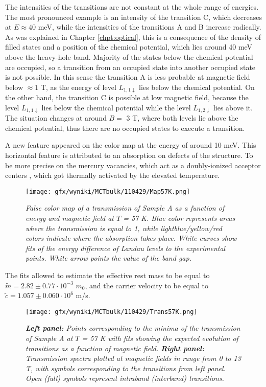 \documentclass[titlepage,a4paper]{book}
\begin{document}
The intensities of the transitions are not constant at the whole range of energies. The most pronounced example is an intensity of the transition C, which decreases at $E \approx 40$ meV, while the intensities of the transitions A and B increase radically. As was explained in Chapter \ref{chpt:optical}, this is a consequence of the density of filled states and a position of the chemical potential, which lies around 40 meV above the heavy-hole band. Majority of the states below the chemical potential are occupied, so a transition from an occupied state into another occupied state is not possible. In this sense the transition A is less probable at magnetic field below $\approx 1$ T, as the energy of level $L_{1,1\downarrow}$ lies below the chemical potential. On the other hand, the transition C is possible at low magnetic field, because the level $L_{1,1\downarrow}$ lies below the chemical potential while the level $L_{1,2\downarrow}$ lies above it. The situation changes at around $B =$ 3 T, where both levels lie above the chemical potential, thus there are no occupied states to execute a transition. 
 
A new feature appeared on the color map at the energy of around 10 meV. This horizontal feature is attributed to an absorption on defects of the structure. To be more precise on the mercury vacancies, which act as a doubly-ionized acceptor centers \cite{Kozlov_MCT_bulk}, which got thermally activated by the elevated temperature.

\begin{figure}[ht]
	\centering
	\texttt{[image: gfx/wyniki/MCTbulk/110429/Map57K.png]}
	\vspace{-10pt}
	\caption{\textit{False color map of a transmission of Sample A as a function of energy and magnetic field at $T$ = 57 K. Blue color represents areas where the transmission is equal to 1, while lightblue/yellow/red colors indicate where the absorption takes place. White curves show fits of the energy difference of Landau levels to the experimental points. White arrow points the value of the band gap.}}
	\label{fig:Map_110429_57K}
\end{figure} 

The fits allowed to estimate the effective rest mass to be equal to $\tilde m = 2.82 \pm 0.77 \cdot 10^{-3}$ $m_0$, and the carrier velocity to be equal to $\tilde{c} = 1.057 \pm 0.060 \cdot 10^6$ m/s. 

\begin{figure}[H]
	\centering
	\texttt{[image: gfx/wyniki/MCTbulk/110429/Trans57K.png]}
	\vspace{-10pt}
	\caption{\textit{\textbf{Left panel:} Points corresponding to the minima of the transmission of Sample A at $T$ = 57 K with fits showing the expected evolution of transitions as a function of magnetic field. \textbf{Right panel:} Transmission spectra plotted at magnetic fields in range from 0 to 13 T, with symbols corresponding to the transitions from left panel. Open (full) symbols represent intraband (interband) transitions.}}
	\label{fig:Spectra_110429_57K}
\end{figure}  
\end{document}
